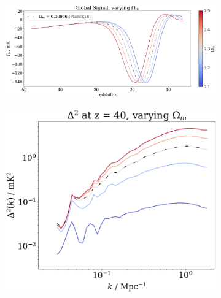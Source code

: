 \documentclass[floats,floatfix,showpacs,amssymb,prd,superscriptaddress,nofootinbib]{revtex4-2} %
\begin{document}
\begin{figure}[H]
     \centering
     \begin{subfigure}[b]{0.9\textwidth}
         \centering
         \includegraphics[width=\textwidth]{images/simulation_results/global_signal_Om.png}
         \label{fig:global_signal_Om}
     \end{subfigure}
     \hfill
     \begin{subfigure}[b]{0.45\textwidth}
         \centering
         \includegraphics[width=\textwidth]{images/simulation_results/power_spectrum_fixed_z_40_Om.png}
         \label{fig:power_spectrum_fixed_z_40_Om}
     \end{subfigure}
     \hfill
     \begin{subfigure}[b]{0.45\textwidth}
         \centering

\end{subfigure}
\end{figure}
\end{document}
